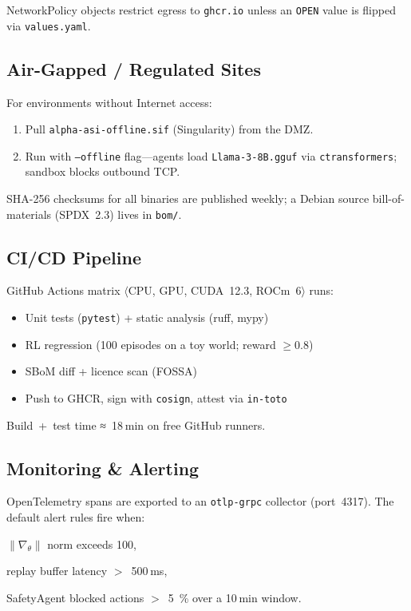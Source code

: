 NetworkPolicy objects restrict egress to \texttt{ghcr.io} unless an \texttt{OPEN} value is flipped via \texttt{values.yaml}.

\subsection{Air-Gapped / Regulated Sites}

For environments without Internet access:

\begin{enumerate}[label=\alph*)]
  \item Pull \texttt{alpha-asi-offline.sif} (Singularity) from the DMZ.
  \item Run with \texttt{--offline} flag—agents load \texttt{Llama-3-8B.gguf} via \texttt{ctransformers}; sandbox blocks outbound TCP.
\end{enumerate}

SHA-256 checksums for all binaries are published weekly;
a Debian source bill-of-materials (SPDX 2.3) lives in \texttt{bom/}.

\subsection{CI/CD Pipeline}

GitHub Actions matrix $\langle$CPU, GPU, CUDA 12.3, ROCm 6$\rangle$ runs:

\begin{itemize}
  \item Unit tests (\texttt{pytest}) + static analysis (ruff, mypy)
  \item RL regression (100 episodes on a toy world; reward $\ge 0.8$)
  \item SBoM diff + licence scan (FOSSA)
  \item Push to GHCR, sign with \texttt{cosign}, attest via \texttt{in-toto}
\end{itemize}

Build + test time ≈ 18 min on free GitHub runners.

\subsection{Monitoring \& Alerting}

OpenTelemetry spans are exported to an \texttt{otlp-grpc} collector (port 4317). The default alert rules fire when:

\begin{enumerate*}
  \item $\lVert\nabla_\theta\rVert$ norm exceeds 100,
  \item replay buffer latency $>$ 500 ms,
  \item SafetyAgent blocked actions $>$ 5 \% over a 10 min window.
\end{enumerate*}

